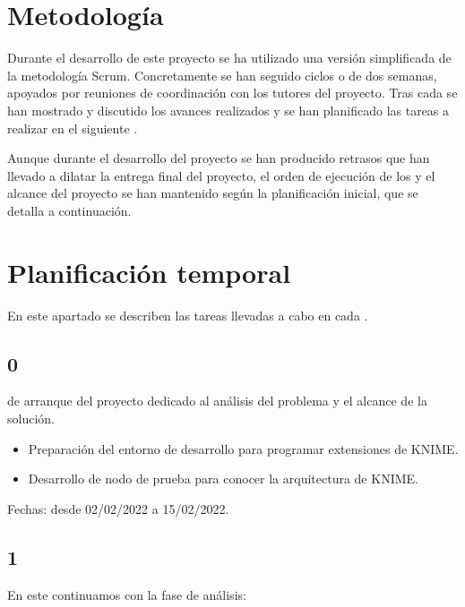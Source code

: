 \label{sec:appendixA}

\section{Metodología}

Durante el desarrollo de este proyecto se ha utilizado una versión simplificada de la metodología Scrum. Concretamente se han
seguido ciclos o  de dos semanas, apoyados por reuniones de coordinación con los tutores del proyecto. Tras cada  se 
han mostrado y discutido los avances realizados y se han planificado las tareas a realizar en el siguiente . 
\

Aunque durante el desarrollo del proyecto se han producido retrasos que han llevado a dilatar la 
entrega final del proyecto, el orden de ejecución de los  y el alcance del proyecto se han 
mantenido según la planificación inicial, que se detalla a continuación. 


\section{Planificación temporal}

En este apartado se describen las tareas llevadas a cabo en cada . 

\subsection{ 0}

 de arranque del proyecto dedicado al análisis del problema y el alcance de la solución. 

\begin{itemize}
	\item Preparación del entorno de desarrollo para programar extensiones de KNIME.
	\item Desarrollo de nodo de prueba para conocer la arquitectura de KNIME.
\end{itemize}

Fechas: desde 02/02/2022 a 15/02/2022.

\subsection{ 1}

En este  continuamos con la fase de análisis: 

